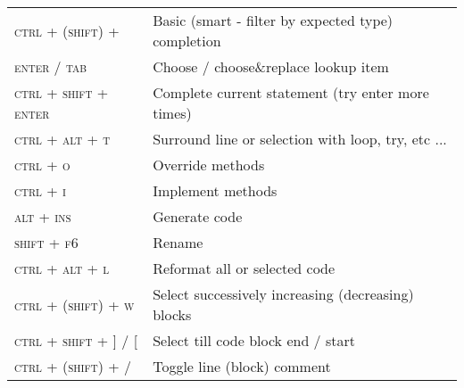 \documentclass[10pt,a4paper]{article}
\newenvironment{mycolorbox}[2]{%
\begin{tcolorbox}[grow to left by=-1em,grow to right by=-1em,capture=minipage,fonttitle=\large\bfseries, enhanced jigsaw,boxsep=1mm,colback=#1!30!white,on line,tcbox width=auto, toptitle=0mm,colframe=#1,opacityback=0.25,nobeforeafter,title=#2]%
}{\end{tcolorbox}\\[0.2em]}
\newenvironment{textbox}[1]{\begin{mycolorbox}{customcolor}{#1}}{\end{mycolorbox}}
\newcommand{\scut}[1]{\textsc{#1}}
\begin{document}
\begin{multicols}{2}
\begin{textbox}{Code Editing}
{
{\renewcommand{\arraystretch}{1.4}
\begin{tabularx}{\textwidth}{>{\setlength\hsize{.38\hsize}\raggedleft\arraybackslash}X|X}
\scut{ctrl + (shift) + \textvisiblespace}	&	Basic (smart - filter by expected type) completion \\
\scut{enter / tab}	&	Choose / choose\&replace lookup item	\\
\scut{ctrl + shift + enter}	&	Complete current statement (try enter more times)	\\
\scut{ctrl + alt + t}	&	Surround line or selection with loop, try, etc ...	\\
\scut{ctrl + o}	&	Override methods	\\
\scut{ctrl + i}	&	Implement methods	\\
\scut{alt + ins}	&	Generate code \\
\scut{shift + f6}	&	Rename	\\
\scut{ctrl + alt + l}	&	Reformat all or selected code	\\
\scut{ctrl + (shift) + w}	&	Select successively increasing (decreasing) blocks	\\
\scut{ctrl + shift + ] / [}	&	Select till code block end / start	\\
\scut{ctrl + (shift) + /}	&	Toggle line (block) comment	
\end{tabularx}}}
\end{textbox}


\end{multicols}
\end{document}
